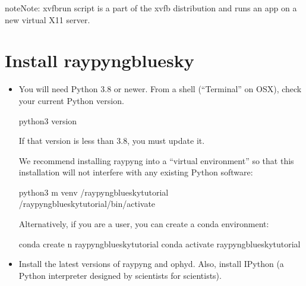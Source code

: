 \documentclass[letterpaper,10pt,english]{sphinxmanual}
\begin{document}
\begin{sphinxadmonition}{note}{Note:}
\sphinxAtStartPar
xvfb\sphinxhyphen{}run script is a part of the xvfb distribution and
runs an app on a new virtual X11 server.
\end{sphinxadmonition}


\section{Install raypyng\sphinxhyphen{}bluesky}
\label{\detokenize{installation:install-raypyng-bluesky}}\begin{itemize}
\item {} 
\sphinxAtStartPar
You will need Python 3.8 or newer. From a shell (“Terminal” on OSX),
check your current Python version.

\begin{sphinxVerbatim}[commandchars=\\\{\}]
python3 \PYGZhy{}\PYGZhy{}version
\end{sphinxVerbatim}

\sphinxAtStartPar
If that version is less than 3.8, you must update it.

\sphinxAtStartPar
We recommend installing raypyng into a “virtual environment” so that this
installation will not interfere with any existing Python software:

\begin{sphinxVerbatim}[commandchars=\\\{\}]
python3 \PYGZhy{}m venv \PYGZti{}/raypyng\PYGZhy{}bluesky\PYGZhy{}tutorial
 \PYGZti{}/raypyng\PYGZhy{}bluesky\PYGZhy{}tutorial/bin/activate
\end{sphinxVerbatim}

\sphinxAtStartPar
Alternatively, if you are a
 user,
you can create a conda environment:

\begin{sphinxVerbatim}[commandchars=\\\{\}]
conda create \PYGZhy{}n raypyng\PYGZhy{}bluesky\PYGZhy{}tutorial 
conda activate raypyng\PYGZhy{}bluesky\PYGZhy{}tutorial
\end{sphinxVerbatim}

\item {} 
\sphinxAtStartPar
Install the latest versions of raypyng and ophyd. Also, install IPython
(a Python interpreter designed by scientists for scientists).


\end{itemize}
\end{document}

